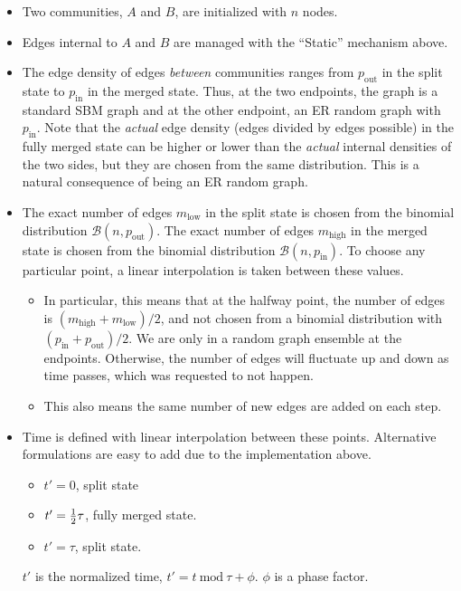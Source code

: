 \documentclass{article}
\def\pin{p_\mathrm{in}}
\def\pout{p_\mathrm{out}}
\def\low{\mathrm{low}}
\def\high{\mathrm{high}}
\begin{document}
\begin{itemize}
\item Two communities, $A$ and $B$, are initialized with $n$ nodes.
\item Edges internal to $A$ and $B$ are managed with the ``Static''
  mechanism above.
\item The edge density of edges \textsl{between} communities ranges
  from $\pout$ in the split state to $\pin$ in the merged state.
  Thus, at the two endpoints, the graph is a standard SBM graph and at
  the other endpoint, an ER random graph with $\pin$.  Note that the
  \textsl{actual} edge density (edges divided by edges possible) in
  the fully merged state can be higher or lower than the
  \textsl{actual} internal densities of
  the two sides, but they are chosen from the same distribution.  This
  is a natural consequence of being an ER random graph.
\item The exact number of edges $m_\low$ in the split state is chosen
  from the binomial distribution $\mathcal{B}(n, \pout)$.  The exact
  number of edges $m_\high$ in the merged state is chosen from the
  binomial distribution $\mathcal{B}(n, \pin)$.  To choose any
  particular point, a linear interpolation is taken between these
  values.
  \begin{itemize}
  \item In particular, this means that at the halfway point, the
    number of edges is $(m_\high+m_\low)/2$, and not chosen from a
    binomial distribution with $(\pin+\pout)/2$.  We are only in a
    random graph ensemble at the endpoints.  Otherwise, the number of
    edges will fluctuate up and down as time passes, which was
    requested to not happen.
  \item This also means the same number of new edges are added on each
    step.
  \end{itemize}
\item Time is defined with linear interpolation between these
  points.  Alternative formulations are easy to add due to the
  implementation above.
  \begin{itemize}
  \item $t'=0$, split state
  \item $t'={1 \over 2} \tau$, fully merged state.
  \item $t'=\tau$, split state.
  \end{itemize}
  $t'$ is the normalized time, $t' = t ~ \mathrm{mod} ~ \tau + \phi$.  $\phi$ is a
  phase factor.
\end{itemize}
\end{document}
